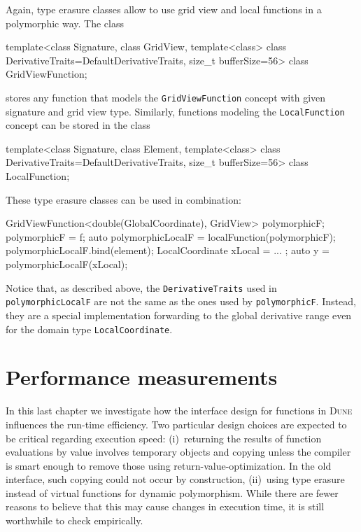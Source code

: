 \documentclass[11pt,
                 numbers=noenddot,
                 headings=normal,
                 DIV16, BCOR10mm]{scrartcl}
\newcommand{\cpp}{\lstinline}
\theoremstyle{remark}
\newcommand{\dune}{\textsc{Dune}\xspace}
\begin{document}
Again, type erasure classes allow to use grid view and local functions in a polymorphic way.
The class
\begin{c++}
template<class Signature,
         class GridView,
         template<class> class DerivativeTraits=DefaultDerivativeTraits,
         size_t bufferSize=56>
class GridViewFunction;
\end{c++}
stores any function that models the \cpp{GridViewFunction}
concept with given signature and grid view type.
Similarly, functions modeling the \cpp{LocalFunction} concept
can be stored in the class
\begin{c++}
template<class Signature,
         class Element,
         template<class> class DerivativeTraits=DefaultDerivativeTraits,
         size_t bufferSize=56>
class LocalFunction;
\end{c++}
These type erasure classes can be used in combination:
\begin{c++}
GridViewFunction<double(GlobalCoordinate), GridView> polymorphicF;
polymorphicF = f;
auto polymorphicLocalF = localFunction(polymorphicF);
polymorphicLocalF.bind(element);
LocalCoordinate xLocal = ... ;
auto y = polymorphicLocalF(xLocal);
\end{c++}
Notice that, as described above, the \cpp{DerivativeTraits} used
in \cpp{polymorphicLocalF} are not the same as the ones used
by \cpp{polymorphicF}.  Instead, they are a special implementation forwarding
to the global derivative range even for the domain type \cpp{LocalCoordinate}.





\section{Performance measurements}
\label{sec:performance_measurements}

In this last chapter we investigate how the interface design for functions in \dune influences the run-time efficiency.
Two particular design choices are expected to be critical regarding execution speed:
(i)~returning the results of function evaluations
by value involves temporary objects and copying unless the compiler is smart enough to remove those using
return-value-optimization.  In the old interface, such copying could
not occur by construction, (ii)~using type erasure instead of
virtual functions for dynamic polymorphism. While there are fewer reasons to
believe that this may cause changes in execution time, it is still worthwhile to check empirically.
\end{document}
